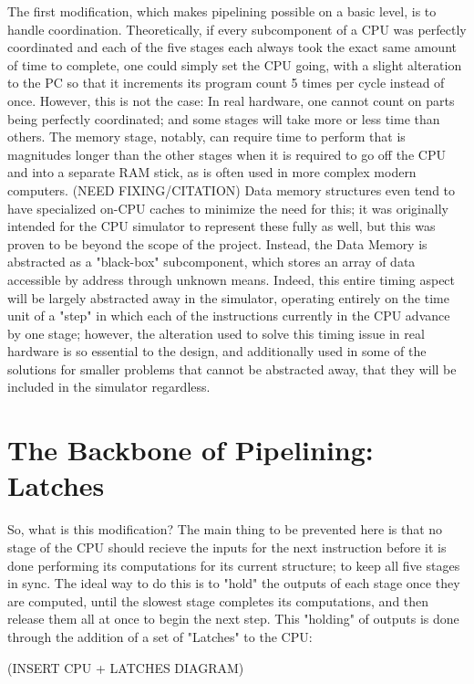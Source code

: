 \documentclass[12pt,twoside]{reedthesis}
\begin{document}
The first modification, which makes pipelining possible on a basic level, is to handle coordination. Theoretically, if  every subcomponent of a CPU was perfectly coordinated and each of the five stages each always took the exact same amount of time to complete, one could simply set the CPU going, with a slight alteration to the PC so that it increments its program count 5 times per cycle instead of once. However, this is not the case: In real hardware, one cannot count on parts being perfectly coordinated; and some stages will take more or less time than others. The memory stage, notably, can require time to perform that is magnitudes longer than the other stages when it is required to go off the CPU and into a separate RAM stick, as is often used in more complex modern computers. (NEED FIXING/CITATION) Data memory structures even tend to have specialized on-CPU caches to minimize the need for this; it was originally intended for the CPU simulator to represent these fully as well, but this was proven to be beyond the scope of the project. Instead, the Data Memory is abstracted as a "black-box" subcomponent, which stores an array of data accessible by address through unknown means. Indeed, this entire timing aspect will be largely abstracted away in the simulator, operating entirely on the time unit of a "step" in which each of the instructions currently in the CPU advance by one stage; however, the alteration used to solve this timing issue in real hardware is so essential to the design, and additionally used in some of the solutions for smaller problems that cannot be abstracted away, that they will be included in the simulator regardless. 

\section{The Backbone of Pipelining: Latches}

So, what is this modification? The main thing to be prevented here is that no stage of the CPU should recieve the inputs for the next instruction before it is done performing its computations for its current structure; to keep all five stages in sync. The ideal way to do this is to "hold" the outputs of each stage once they are computed, until the slowest stage completes its computations, and then release them all at once to begin the next step. This "holding" of outputs is done through the addition of a set of "Latches" to the CPU: 

(INSERT CPU + LATCHES DIAGRAM)
\end{document}
